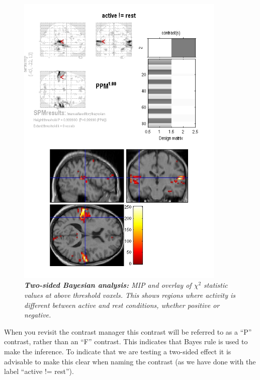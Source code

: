 \begin{figure}
\begin{center}
\includegraphics[width=100mm]{auditory/aud_bayes2}
\caption{\em \textbf{Two-sided Bayesian analysis:} MIP and overlay of $\chi^2$ statistic values at above threshold voxels. This shows regions where activity is different between active and rest conditions, whether positive or negative. \label{aud_bayes2} }
\end{center}
\end{figure}

When you revisit the contrast manager this contrast will be referred to as a ``P'' contrast, rather than an ``F'' contrast. This indicates that Bayes rule is used to make the inference. To indicate that we are testing a two-sided effect it is advisable to make this clear when naming the contrast (as we have done with the label ``active != rest'').

